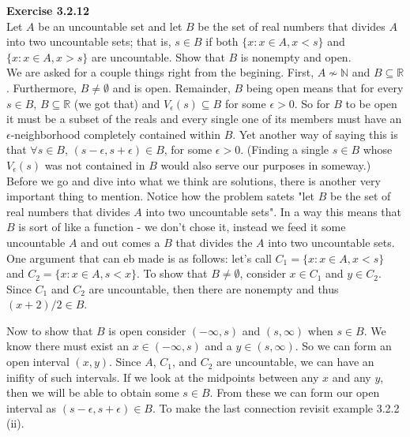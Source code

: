 \textbf{Exercise 3.2.12}
\\

Let $A$ be an uncountable set and let $B$ be the set of real numbers that divides $A$ into two uncountable sets;
that is, $s \in B$ if both $\{ x : x \in A, x < s \}$ and $\{ x : x \in A, x > s\}$ are uncountable.
Show that $B$ is nonempty and open.
\\

We are asked for a couple things right from the begining.
First, $A \not\sim \mathbb{N}$ and $B \subseteq \mathbb{R}$.
Furthermore, $B \neq \emptyset$ and is open.
Remainder, $B$ being open means that for every $s\in B$, $B \subseteq \mathbb{R}$ (we got that)
and $V_\epsilon (s) \subseteq B$ for some $\epsilon >0$.
So for $B$ to be open it must be a subset of the reals and every single one of its members must have
an $\epsilon$-neighborhood completely contained within $B$.
Yet another way of saying this is that $\forall s \in B$, $(s-\epsilon, s+\epsilon) \in B$, for some $\epsilon >0$.
(Finding a single $s\in B$ whose $V_{\epsilon} (s)$ was not contained in $B$ would also serve our purposes in someway.)
\\

Before we go and dive into what we think are solutions, there is another very important thing to mention.
Notice how the problem satets "let $B$ be the set of real numbers that divides $A$ into two uncountable sets".
In a way this means that $B$ is sort of like a function - we don't chose it, instead we feed it some uncountable $A$
and out comes a $B$ that divides the $A$ into two uncountable sets.
\\

One argument that can eb made is as follows: let's call $C_1 = \{ x : x \in A, x < s \}$
and $C_2 = \{ x : x \in A,  s < x \}$.
To show that $B \neq \emptyset$, consider $x \in C_1$ and $y\in C_2$. Since $C_1$ and $C_2$
are uncountable, then there are nonempty and thus $(x+2)/2 \in B$.

Now to show that $B$ is open consider $(-\infty, s)$ and $(s, \infty)$ when $s\in B$.
We know there must exist an $x \in (-\infty , s)$ and a $y \in (s, \infty)$.
So we can form an open interval $(x,y)$.
Since $A$, $C_1$, and $C_2$ are uncountable, we can have an inifity of such intervals.
If we look at the midpoints between any $x$ and any $y$, then we will be able to obtain some $s \in B$.
From these we can form our open interval as $(s-\epsilon , s+\epsilon) \in B$.
To make the last connection revisit example 3.2.2 (ii).
\\

